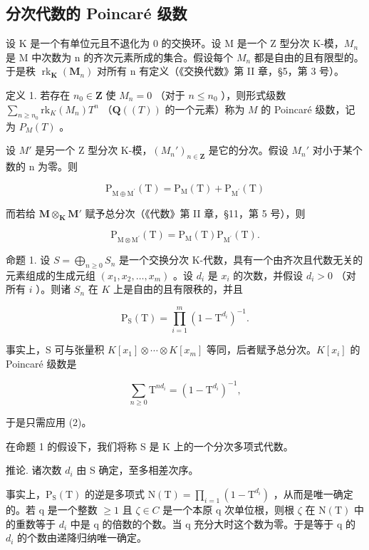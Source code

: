 \subsection{分次代数的 Poincaré 级数}

设 K 是一个有单位元且不退化为 0 的交换环。设 M 是一个 Z 型分次 K-模，\(M_{n}\) 是 M 中次数为 n 的齐次元素所成的集合。假设每个 \(M_{n}\) 都是自由的且有限型的。于是秩 \(\operatorname{rk}_{\mathbf{K}}(\mathbf{M}_{n})\) 对所有 n 有定义（《交换代数》第 II 章，§5，第 3 号）。

定义 1. 若存在 \(n_0 \in \mathbf{Z}\) 使 \(M_n = 0\) （对于 \(n \leqslant n_0\) ），则形式级数 \(\sum_{n \geqslant n_0} \mathrm{rk}_K(M_n) T^n\) （\(\mathbf{Q}((T))\) 的一个元素）称为 \(M\) 的 Poincaré 级数，记为 \(P_M(T)\) 。

设 \(M'\) 是另一个 Z 型分次 K-模，\((M_n')_{n \in \mathbf{Z}}\) 是它的分次。假设 \(M_n'\) 对小于某个数的 n 为零。则

\[
\mathrm{P} _ {\mathrm{M} \oplus \mathrm{M} ^ {\prime}} (\mathrm{T}) = \mathrm{P} _ {\mathrm{M}} (\mathrm{T}) + \mathrm{P} _ {\mathrm{M} ^ {\prime}} (\mathrm{T})\tag{1}
\]

而若给 \(\mathbf{M} \otimes_{\mathbf{K}} \mathbf{M}'\) 赋予总分次（《代数》第 II 章，§11，第 5 号），则

\[
\mathrm{P} _ {\mathrm{M} \otimes \mathrm{M} ^ {\prime}} (\mathrm{T}) = \mathrm{P} _ {\mathrm{M}} (\mathrm{T}) \mathrm{P} _ {\mathrm{M} ^ {\prime}} (\mathrm{T}).\tag{2}
\]

命题 1. 设 \(S = \bigoplus_{n \geqslant 0} S_n\) 是一个交换分次 K-代数，具有一个由齐次且代数无关的元素组成的生成元组 \((x_1, x_2, \ldots, x_m)\) 。设 \(d_i\) 是 \(x_i\) 的次数，并假设 \(d_i > 0\) （对所有 \(i\) ）。则诸 \(S_n\) 在 \(K\) 上是自由的且有限秩的，并且

\[
\mathrm{P} _ {\mathrm{S}} (\mathrm{T}) = \prod_ {i = 1} ^ {m} (1 - \mathrm{T} ^ {d _ {i}}) ^ {- 1}.\tag{3}
\]

事实上，S 可与张量积 \(K[x_{1}] \otimes \cdots \otimes K[x_{m}]\) 等同，后者赋予总分次。\(K[x_{i}]\) 的 Poincaré 级数是

\[
\sum_ {n \geqslant 0} \mathrm{T} ^ {n d _ {i}} = (1 - \mathrm{T} ^ {d _ {i}}) ^ {- 1},
\]

于是只需应用 (2)。

在命题 1 的假设下，我们将称 S 是 K 上的一个分次多项式代数。

推论. 诸次数 \(d_{i}\) 由 S 确定，至多相差次序。

事实上，\(\mathrm{P}_{\mathrm{S}}(\mathrm{T})\) 的逆是多项式 \(\mathrm{N}(\mathrm{T}) = \prod_{i=1}(1 - \mathrm{T}^{d_i})\) ，从而是唯一确定的。若 q 是一个整数 \(\geqslant 1\) 且 \(\zeta \in C\) 是一个本原 q 次单位根，则根 \(\zeta\) 在 \(\mathrm{N}(\mathrm{T})\) 中的重数等于 \(d_{i}\) 中是 q 的倍数的个数。当 q 充分大时这个数为零。于是等于 q 的 \(d_{i}\) 的个数由递降归纳唯一确定。

